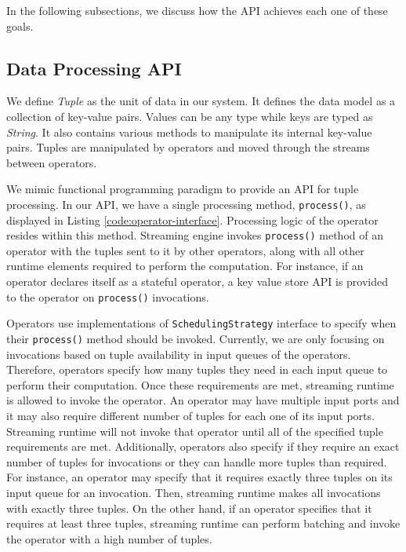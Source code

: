 In the following subsections, we discuss how the API achieves each one of these goals.

\subsection{Data Processing API}\label{sec:data-processing-api}

We define \textit{Tuple} as the unit of data in our system. It defines the data model as a collection of key-value pairs. Values can be any type while keys are typed as \textit{String}. It also contains various methods to manipulate its internal key-value pairs. Tuples are manipulated by operators and moved through the streams between operators.

We mimic functional programming paradigm to provide an API for tuple processing. In our API, we have a single processing method, \texttt{process()}, as displayed in Listing \ref{code:operator-interface}. Processing logic of the operator resides within this method. Streaming engine invokes \texttt{process()} method of an operator with the tuples sent to it by other operators, along with all other runtime elements required to perform the computation. For instance, if an operator declares itself as a stateful operator, a key value store API is provided to the operator on \texttt{process()} invocations. 

Operators use implementations of \texttt{SchedulingStrategy} interface to specify when their \texttt{process()} method should be invoked. Currently, we are only focusing on invocations based on tuple availability in input queues of the operators. Therefore, operators specify how many tuples they need in each input queue to perform their computation. Once these requirements are met, streaming runtime is allowed to invoke the operator. An operator may have multiple input ports and it may also require different number of tuples for each one of its input ports. Streaming runtime will not invoke that operator until all of the specified tuple requirements are met. Additionally, operators also specify if they require an exact number of tuples for invocations or they can handle more tuples than required. For instance, an operator may specify that it requires exactly three tuples on its input queue for an invocation. Then, streaming runtime makes all invocations with exactly three tuples. On the other hand, if an operator specifies that it requires at least three tuples, streaming runtime can perform batching and invoke the operator with a high number of tuples. 

